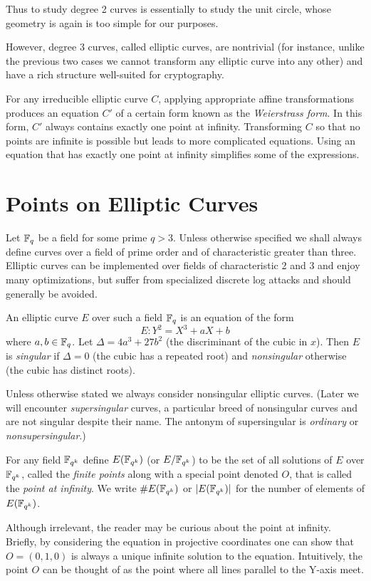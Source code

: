 Thus to study degree 2 curves is essentially to study the unit circle,
whose geometry is again is too simple for our purposes.

However, degree 3 curves, called elliptic curves,
are nontrivial (for instance, unlike the previous two
cases we cannot transform any elliptic curve into
any other)
and have a rich structure well-suited for cryptography.

For any irreducible elliptic curve $C$,
applying appropriate affine transformations
produces an equation $C'$ of a certain form known
as the \emph{Weierstrass form}.
In this form, $C'$ always contains exactly one point at infinity.
Transforming $C$ so
that no points are infinite is
possible but leads to more complicated
equations. Using an equation that has
exactly one point at infinity simplifies some of the expressions.

\section {Points on Elliptic Curves}

Let $\mathbb{F}_q$ be a field for some prime $q > 3$.
Unless otherwise specified we shall always
define curves over a field of prime order and of characteristic greater
than three.
Elliptic curves can be implemented over fields of characteristic 2 and 3
and enjoy many optimizations,
but suffer from specialized discrete log attacks and should generally
be avoided.

An elliptic curve $E$ over such a field $\mathbb{F}_q$ is an equation of the form
\[ E: Y^2 = X^3 + a X + b \]
where $a, b \in \mathbb{F}_q$.
Let $\Delta = 4 a^3 + 27b^2$ (the discriminant of the cubic in $x$). Then
$E$ is \emph{singular} if $\Delta = 0$ (the cubic has a repeated root)
and \emph{nonsingular} otherwise (the cubic has distinct roots).

Unless otherwise stated we always consider nonsingular elliptic curves.
(Later we will encounter \emph{supersingular} curves, a particular
breed of nonsingular curves and are not singular despite their name.
The antonym of supersingular is \emph{ordinary} or \emph{nonsupersingular}.)

For any field $\mathbb{F}_{q^k}$ define $E(\mathbb{F}_{q^k})$ (or $E/\mathbb{F}_{q^k}$)
to be the set of all solutions
of $E$ over $\mathbb{F}_{q^k}$, called the \emph{finite points}
along with a special point denoted $O$,
that is called the \emph{point at infinity}. We write $\#E(\mathbb{F}_{q^k})$ 
or $|E(\mathbb{F}_{q^k})|$ for
the number of elements of $E(\mathbb{F}_{q^k})$.

Although irrelevant, the reader may be curious about the point at infinity.
Briefly, by considering the equation in
projective coordinates one can show that $O = (0,1,0)$ is always a unique
infinite solution to the equation. Intuitively,
the point $O$ can be thought of as the point where all lines
parallel to the Y-axis meet.

